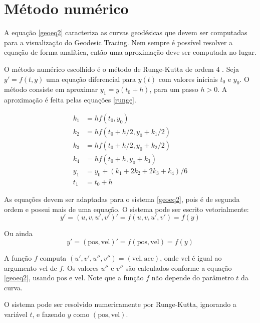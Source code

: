 \chapter{Método numérico}
\label{numeric}

A equação \ref{geoeq2} caracteriza as curvas geodésicas que devem ser 
computadas para a visualização do Geodesic Tracing.
Nem sempre é possível resolver a equação de forma analítica, então uma aproximação
deve ser computada no lugar.

O método numérico escolhido é o método de Runge-Kutta de ordem 4 \cite{Anal:1}.
Seja $y' = f(t, y)$ uma equação diferencial para $y(t)$ com valores iniciais $t_0$ e $y_0$.
O método consiste em aproximar $y_1 = y(t_0+h)$, para um passo $h>0$.
A aproximação é feita pelas equações \ref{runge}.

\begin{equation}
\label{runge}
\begin{split}
k_1 & = hf(t_0, y_0) \\
k_2 & = hf(t_0 + h/2, y_0 + k_1/2) \\
k_3 & = hf(t_0 + h/2, y_0 + k_2/2) \\
k_4 & = hf(t_0 + h, y_0 + k_3) \\
y_1 & = y_0 + (k_1 + 2k_2 + 2k_3 + k_4)/6 \\
t_1 & = t_0 + h
\end{split}
\end{equation}

As equações devem ser adaptadas para o sistema \ref{geoeq2}, pois é de 
segunda ordem e possui mais de uma equação.
O sistema pode ser escrito vetorialmente:
\[y' = (u, v, u', v')' = f(u, v, u', v') = f(y)\]

Ou ainda 
\[y' = (\text{pos}, \text{vel})' = f(\text{pos}, \text{vel}) = f(y)\]

A função $f$ computa $(u', v', u'', v'') = (\text{vel}, \text{acc})$, onde $\text{vel}$ é
igual ao argumento $\text{vel}$ de $f$. Os valores $u''$ e $v''$ são calculados conforme a equação
\ref{geoeq2}, usando $\text{pos}$ e $\text{vel}$.
Note que a função $f$ não depende do parâmetro $t$ da curva.

O sistema pode ser resolvido numericamente por Runge-Kutta, ignorando a variável $t$,
e fazendo $y$ como $(\text{pos}, \text{vel})$.

